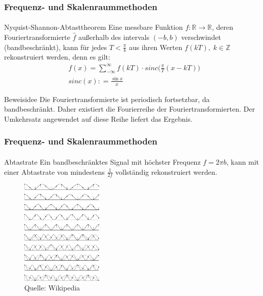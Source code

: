 \documentclass{beamer}
\begin{document}
\begin{frame}
    \frametitle{Frequenz- und Skalenraummethoden}
\framesubtitle{}
\begin{block}{Nyquist-Shannon-Abtasttheorem}
Eine messbare Funktion $f: \mathbb{R} \to  \mathbb{R}$, deren Fouriertransformierte $\hat{f}$ außerhalb des intervals $(-b,b)$ verschwindet (bandbeschränkt), kann für jedes $T < \frac{\pi}{b}$ aus ihren Werten $f(kT), \; k \in \mathbb{Z}$ rekonstruiert werden, denn es gilt:
\begin{align*}
& f(x) = \sum_{-\infty}^{\infty} f(kT) \cdot sinc \biggl (\frac{\pi}{T}(x - kT) \biggr) \\
& sinc(x): = \frac{\sin x}{x}
\end{align*}
\end{block}
\begin{block}{Beweisidee}
Die Fouriertransformierte ist periodisch fortsetzbar, da bandbeschränkt. Daher existiert die Fourierreihe der Fouriertransformierten. Der Umkehrsatz angewendet auf diese Reihe liefert das Ergebnis.
\end{block}
 \end{frame}

\begin{frame}
    \frametitle{Frequenz- und Skalenraummethoden}
\framesubtitle{}

\begin{block}{Abtastrate}
Ein bandbeschränktes Signal mit höchster Frequenz $f = 2 \pi b$, kann  mit einer Abtastrate von mindestens $\frac{1}{2f}$ vollständig rekonstruiert werden. 
\end{block}
\begin{figure}[htp]
      \centering
    \includegraphics[width=0.35\textwidth]{img/Abtast}
      \caption{Quelle: Wikipedia}
\end{figure}

 \end{frame}
\end{document}
